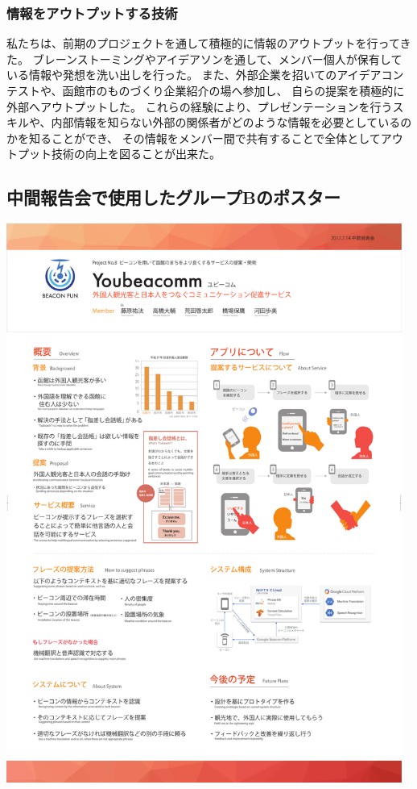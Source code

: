 \documentclass[11pt,papersize]{jsbook}
\begin{document}
\subsection{情報をアウトプットする技術}
 私たちは、前期のプロジェクトを通して積極的に情報のアウトプットを行ってきた。
ブレーンストーミングやアイデアソンを通して、メンバー個人が保有している情報や発想を洗い出しを行った。
また、外部企業を招いてのアイデアコンテストや、函館市のものづくり企業紹介の場へ参加し、
自らの提案を積極的に外部へアウトプットした。
これらの経験により、プレゼンテーションを行うスキルや、内部情報を知らない外部の関係者がどのような情報を必要としているのかを知ることができ、
その情報をメンバー間で共有することで全体としてアウトプット技術の向上を図ることが出来た。

\begin{appendix}

\chapter{中間報告会で使用したグループBのポスター}
\begin{center}
\includegraphics[width=13cm]{gbt.pdf}
\end{center}

\end{appendix}
\end{document}
